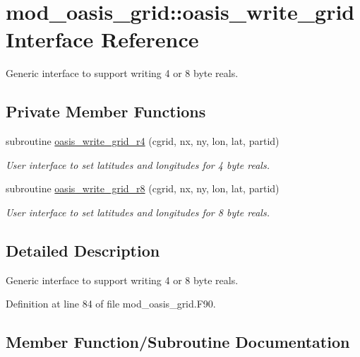 \hypertarget{interfacemod__oasis__grid_1_1oasis__write__grid}{}\section{mod\+\_\+oasis\+\_\+grid\+:\+:oasis\+\_\+write\+\_\+grid Interface Reference}
\label{interfacemod__oasis__grid_1_1oasis__write__grid}


Generic interface to support writing 4 or 8 byte reals.  


\subsection*{Private Member Functions}
\begin{DoxyCompactItemize}
\item 
subroutine \hyperlink{interfacemod__oasis__grid_1_1oasis__write__grid_a7eede475150c0fa6692193c940d4268b}{oasis\+\_\+write\+\_\+grid\+\_\+r4} (cgrid, nx, ny, lon, lat, partid)
\begin{DoxyCompactList}\small\item\em User interface to set latitudes and longitudes for 4 byte reals. \end{DoxyCompactList}\item 
subroutine \hyperlink{interfacemod__oasis__grid_1_1oasis__write__grid_a31dbc6c9b5268a261b61a005762ffb28}{oasis\+\_\+write\+\_\+grid\+\_\+r8} (cgrid, nx, ny, lon, lat, partid)
\begin{DoxyCompactList}\small\item\em User interface to set latitudes and longitudes for 8 byte reals. \end{DoxyCompactList}\end{DoxyCompactItemize}


\subsection{Detailed Description}
Generic interface to support writing 4 or 8 byte reals. 

Definition at line 84 of file mod\+\_\+oasis\+\_\+grid.\+F90.



\subsection{Member Function/\+Subroutine Documentation}
\mbox{\label{interfacemod__oasis__grid_1_1oasis__write__grid_a7eede475150c0fa6692193c940d4268b}} 
